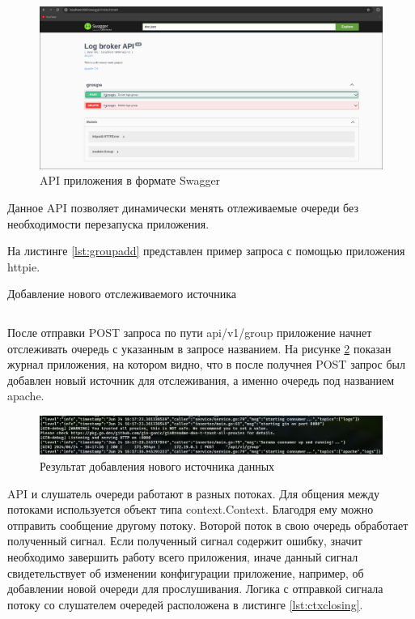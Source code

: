 \documentclass[14pt, russian]{scrartcl}
\begin{document}
\begin{figure}[H]
	\centering
	\begin{minipage}[t]{.9\textwidth}
		\centering
		\includegraphics[width=.7\textwidth]{./imgs/swagger.png}
	\end{minipage}
	\caption{API приложения в формате Swagger}
	\label{fig:api}
\end{figure}

Данное API позволяет динамически менять отлеживаемые
очереди без необходимости перезапуска
приложения.

На листинге \ref{lst:groupadd} представлен пример запроса с помощью приложения httpie.

\begin{listing}[H]
	\caption{Добавление нового отслеживаемого источника}
	\label{lst:groupadd}
	\inputminted[style=bw, frame=single,fontsize = \footnotesize, linenos=false, xleftmargin = 1.5em]{shell}{./listings/group.sh}
\end{listing}

После отправки POST запроса по пути api/v1/group приложение начнет
отслеживать очередь с указанным в запросе названием. На рисунке \ref{fig:groupadding}
показан журнал приложения, на котором видно, что в после получнея POST запрос
был добавлен новый источник для отслеживания, а именно очередь под названием
apache.

\begin{figure}[H]
	\centering
	\begin{minipage}[t]{.9\textwidth}
		\centering
		\includegraphics[width=.7\textwidth]{./imgs/addedgroup.png}
	\end{minipage}
	\caption{Результат добавления нового источника данных}
	\label{fig:groupadding}
\end{figure}


API и слушатель очереди работают в разных потоках. Для общения между потоками
используется объект типа context.Context. Благодря ему можно отправить сообщение
другому потоку. Воторой поток в свою очередь
обработает полученный сигнал. Если полученный сигнал
содержит ошибку, значит необходимо завершить работу всего приложения, иначе
данный сигнал свидетельствует об изменении конфигурации приложение, например, об
добавлении новой очереди для прослушивания. Логика с отправкой сигнала потоку
со слушателем очередей расположена в листинге \ref{lst:ctxclosing}.
\end{document}
